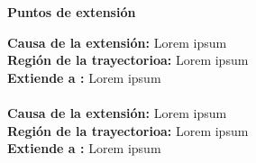 \begin{large}
	\textbf{Puntos de extensión}\\
\end{large}	

\textbf{Causa de la extensión:} Lorem ipsum\\
\textbf{Región de la trayectorioa:} Lorem ipsum\\
\textbf{Extiende a :} Lorem ipsum\\\\

\textbf{Causa de la extensión:} Lorem ipsum\\
\textbf{Región de la trayectorioa:} Lorem ipsum\\
\textbf{Extiende a :} Lorem ipsum\\

